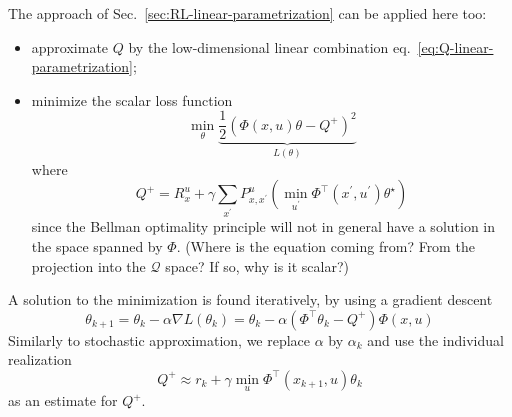 The approach of Sec.~\ref{sec:RL-linear-parametrization} can be applied here too:
\begin{itemize}
\item approximate $Q$ by the low-dimensional linear combination eq.~\eqref{eq:Q-linear-parametrization};
\item minimize the scalar loss function
  \begin{equation*}
    \min_\theta \underbrace{\frac{1}{2} \left(\Phi(x,u)\theta - Q^+\right)^2}_{L(\theta)}
  \end{equation*}
  where
  \begin{equation*}
    Q^+ = R_x^u + \gamma \sum_{x^\prime} P_{x,x^\prime}^u \left(\min_{u^\prime} \Phi^\top(x^\prime,u^\prime)\theta^\star\right)
  \end{equation*}
  since the Bellman optimality principle will not in general have a solution in the space spanned by $\Phi$. (Where is the equation coming from? From the projection into the $\mathcal{Q}$ space? If so, why is it scalar?)
\end{itemize}
A solution to the minimization is found iteratively, by using a gradient descent
\begin{equation*}
  \theta_{k+1} = \theta_k - \alpha \nabla L(\theta_k) = \theta_k - \alpha \left(\Phi^\top\theta_k - Q^+\right)\Phi(x,u)
\end{equation*}
Similarly to stochastic approximation, we replace $\alpha$ by $\alpha_k$ and use the individual realization
\begin{equation*}
  Q^+\approx r_k + \gamma \min_u \Phi^\top(x_{k+1},u)\theta_k
\end{equation*}
as an estimate for $Q^+$.



